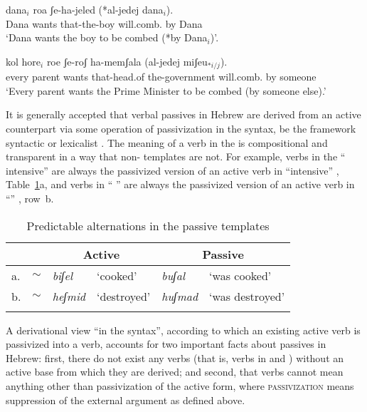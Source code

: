 \begin{exe}
\begin{xlist}
\begin{exe}
\begin{xlist}
\begin{exe}
\begin{exe}
\begin{xlist}
\begin{exe}
\begin{exe}
\begin{xlist}
\begin{exe}
 \ex  \label{ex:pass-bind-he} 
 \begin{xlist} 
 	\ex   
		{ \gll dana$_i$ ro{\ts}a ʃe-ha-jeled  (*al-jedej dana$_i$).\\
 		  Dana wants that-the-boy will.comb. by Dana\\
 		\glt `Dana wants the boy to be combed (*by Dana$_i$)'. } 
		
 	\ex   
		{ \gll kol hore$_i$ ro{\ts}e ʃe-roʃ ha-memʃala  (al-jedej miʃeu$_{*i/j}$).\\
 		  every parent wants that-head.of the-government will.comb. by someone\\
 		\glt `Every parent wants the Prime Minister to be combed (by someone else).' } 
		
 \z
\z 


It is generally accepted that verbal passives in Hebrew are derived from an active counterpart via some operation of passivization in the syntax, be the framework syntactic \citep{doron03,alexiadoudoron12,borer13oup} or lexicalist \citep{reinhartsiloni05,ussishkin05,laks11}. The meaning of a verb in the  is compositional and transparent in a way that non- templates are not. For example, verbs in the `` intensive'' {\tpua} are always the passivized version of an active verb in ``intensive'' {\tpie}, Table~\ref{tab:5-1:alt}a, and verbs in `` '' {\thuf} are always the passivized version of an active verb in ``'' {\thif}, row~b.

\begin{table}
	\begin{tabularx}{\textwidth}{llllll}
 \lsptoprule
	& & \multicolumn{2}{c}{Active} & \multicolumn{2}{c}{Passive} \\\midrule
	a. & {\tpie} $\sim$ {\tpua} & \emph{biʃel} & `cooked' & \emph{buʃal} & `was cooked'\\
	b. & {\thif} $\sim$ {\thuf} & \emph{heʃmid} & `destroyed' & \emph{huʃmad} & `was destroyed'\\
\lspbottomrule
 	\end{tabularx}
	\caption{Predictable alternations in the passive templates}
	\label{tab:5-1:alt}
\end{table}

A derivational view ``in the syntax'', according to which an existing active verb is passivized into a  verb, accounts for two important facts about passives in Hebrew: first, there do not exist any  verbs (that is, verbs in {\tpua} and {\thuf}) without an active base from which they are derived; and second, that  verbs cannot mean anything other than passivization of the active form, where \textsc{passivization} means suppression of the external argument as defined above.


\end{xlist}
\end{exe}
\end{xlist}
\end{exe}
\end{exe}
\end{xlist}
\end{exe}
\end{exe}
\end{xlist}
\end{exe}
\end{xlist}
\end{exe}

